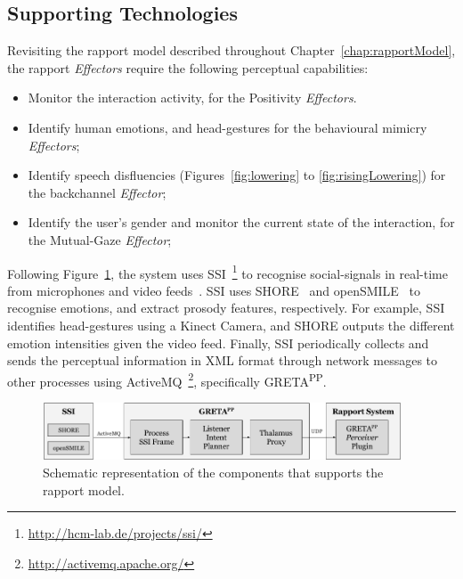 \subsection{Supporting Technologies}
\label{sec:supportingTechnologies}

Revisiting the rapport model described throughout Chapter~\ref{chap:rapportModel}, the rapport \textit{Effectors} require the following perceptual capabilities:
\begin{itemize}
	\item Monitor the interaction activity, for the Positivity \textit{Effectors}.
	\item Identify human emotions, and head-gestures for the behavioural mimicry \textit{Effectors};
	\item Identify speech disfluencies (Figures~\ref{fig:lowering} to \ref{fig:risingLowering}) for the backchannel \textit{Effector};
	\item Identify the user's gender and monitor the current state of the interaction, for the Mutual-Gaze \textit{Effector};
\end{itemize}

Following Figure~\ref{fig:SupportingTechnologiesOverview}, the system uses \ac{SSI}~\footnote{\url{http://hcm-lab.de/projects/ssi/}} to recognise social-signals in real-time from microphones and video feeds~\cite{Wagner2013}. \ac{SSI} uses SHORE~\cite{Ruf2011} and openSMILE~\cite{Eyben:2013:RDO:2502081.2502224} to recognise emotions, and extract prosody features, respectively. For example, \ac{SSI} identifies head-gestures using a Kinect Camera, and SHORE outputs the different emotion intensities given the video feed. Finally, \ac{SSI} periodically collects and sends the perceptual information in \ac{XML} format through network messages to other processes using ActiveMQ~\footnote{\url{http://activemq.apache.org/}}, specifically GRETA\textsuperscript{PP}.

\begin{figure}[H]
	\centering
	\includegraphics[width=0.95\textwidth]{images/SupportingTechnologiesOverview.png}
	\caption{Schematic representation of the components that supports the rapport model.}
	\label{fig:SupportingTechnologiesOverview}
\end{figure}

